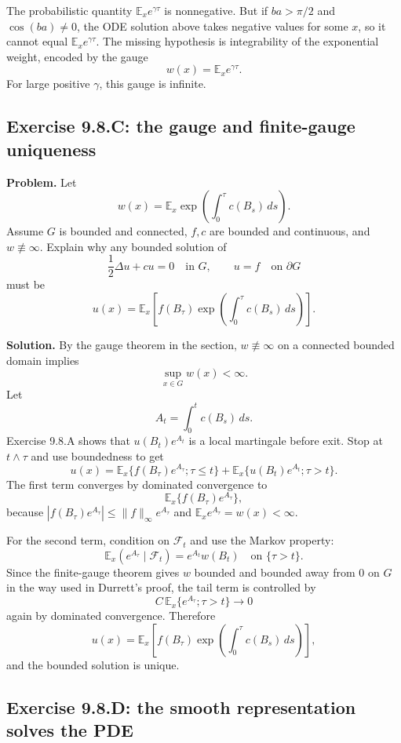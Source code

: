 \documentclass[11pt]{article}
\newcommand{\E}{\mathbb{E}}
\newcommand{\dd}{\,d}
\newcommand{\Del}{\Delta}
\begin{document}
The probabilistic quantity $\E_x e^{\gamma\tau}$ is nonnegative.  But
if $ba>\pi/2$ and $\cos(ba)\ne0$, the ODE solution above takes negative
values for some $x$, so it cannot equal $\E_xe^{\gamma\tau}$.  The
missing hypothesis is integrability of the exponential weight, encoded
by the gauge
\[
  w(x)=\E_x e^{\gamma\tau}.
\]
For large positive $\gamma$, this gauge is infinite.

\subsection*{Exercise 9.8.C: the gauge and finite-gauge uniqueness}

\noindent\textbf{Problem.}
Let
\[
  w(x)=\E_x\exp\left(\int_0^\tau c(B_s)\dd s\right).
\]
Assume $G$ is bounded and connected, $f,c$ are bounded and continuous,
and $w\not\equiv\infty$.  Explain why any bounded solution of
\[
  \frac12\Del u+c u=0\quad\text{in }G,\qquad u=f\quad\text{on }\partial G
\]
must be
\[
  u(x)=
  \E_x\left[
    f(B_\tau)\exp\left(\int_0^\tau c(B_s)\dd s\right)
  \right].
\]

\noindent\textbf{Solution.}
By the gauge theorem in the section, $w\not\equiv\infty$ on a connected
bounded domain implies
\[
  \sup_{x\in G}w(x)<\infty.
\]
Let
\[
  A_t=\int_0^t c(B_s)\dd s.
\]
Exercise 9.8.A shows that $u(B_t)e^{A_t}$ is a local martingale before
exit.  Stop at $t\wedge\tau$ and use boundedness to get
\[
  u(x)
  =
  \E_x\{f(B_\tau)e^{A_\tau};\tau\le t\}
  +
  \E_x\{u(B_t)e^{A_t};\tau>t\}.
\]
The first term converges by dominated convergence to
\[
  \E_x\{f(B_\tau)e^{A_\tau}\},
\]
because $|f(B_\tau)e^{A_\tau}|\le \|f\|_\infty e^{A_\tau}$ and
$\E_xe^{A_\tau}=w(x)<\infty$.

For the second term, condition on $\mathcal{F}_t$ and use the Markov
property:
\[
  \E_x(e^{A_\tau}\mid\mathcal{F}_t)
  =
  e^{A_t}w(B_t)
  \quad\text{on }\{\tau>t\}.
\]
Since the finite-gauge theorem gives $w$ bounded and bounded away from
$0$ on $G$ in the way used in Durrett's proof, the tail term is
controlled by
\[
  C\,\E_x\{e^{A_\tau};\tau>t\}\to0
\]
again by dominated convergence.  Therefore
\[
  u(x)=
  \E_x\left[
    f(B_\tau)\exp\left(\int_0^\tau c(B_s)\dd s\right)
  \right],
\]
and the bounded solution is unique.

\subsection*{Exercise 9.8.D: the smooth representation solves the PDE}
\end{document}
